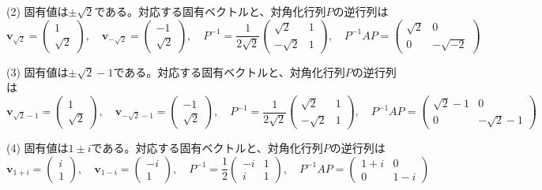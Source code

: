 (2) 固有値は$\pm\sqrt{2}$である。対応する固有ベクトルと、対角化行列$P$の逆行列は
\[
\bm{v}_{\sqrt{2}} = 
\begin{pmatrix}
1 \\
\sqrt{2}
\end{pmatrix}, \quad
\bm{v}_{-\sqrt{2}} = 
\begin{pmatrix}
-1 \\
\sqrt{2}
\end{pmatrix}, \quad
P^{-1} = 
\frac{1}{2\sqrt{2}}
\begin{pmatrix}
\sqrt{2} & 1 \\
-\sqrt{2} & 1
\end{pmatrix}, \quad
P^{-1} AP =
\begin{pmatrix}
\sqrt{2} & 0 \\
0 & -\sqrt{-2}
\end{pmatrix}
\]

(3) 固有値は$\pm \sqrt{2} - 1$である。対応する固有ベクトルと、対角化行列$P$の逆行列は %
\[
\bm{v}_{\sqrt{2} - 1} = 
\begin{pmatrix}
1 \\
\sqrt{2}
\end{pmatrix}, \quad
\bm{v}_{-\sqrt{2} - 1} = 
\begin{pmatrix}
-1 \\
\sqrt{2}
\end{pmatrix}, \quad
P^{-1} = 
\frac{1}{2\sqrt{2}}
\begin{pmatrix}
\sqrt{2} & 1 \\
-\sqrt{2} & 1
\end{pmatrix}, \quad
P^{-1} AP =
\begin{pmatrix}
\sqrt{2} - 1 & 0 \\
0 & - \sqrt{2} - 1
\end{pmatrix}
\]

(4) 固有値は$1 \pm i$である。対応する固有ベクトルと、対角化行列$P$の逆行列は
\[
\bm{v}_{1 + i} = 
\begin{pmatrix}
i \\
1
\end{pmatrix}, \quad
\bm{v}_{1 - i} = 
\begin{pmatrix}
-i \\
1
\end{pmatrix}, \quad
P^{-1} = 
\frac{1}{2}
\begin{pmatrix}
-i & 1 \\
i & 1
\end{pmatrix}, \quad
P^{-1} AP =
\begin{pmatrix}
1 + i & 0 \\
0 & 1 - i
\end{pmatrix}
\]


